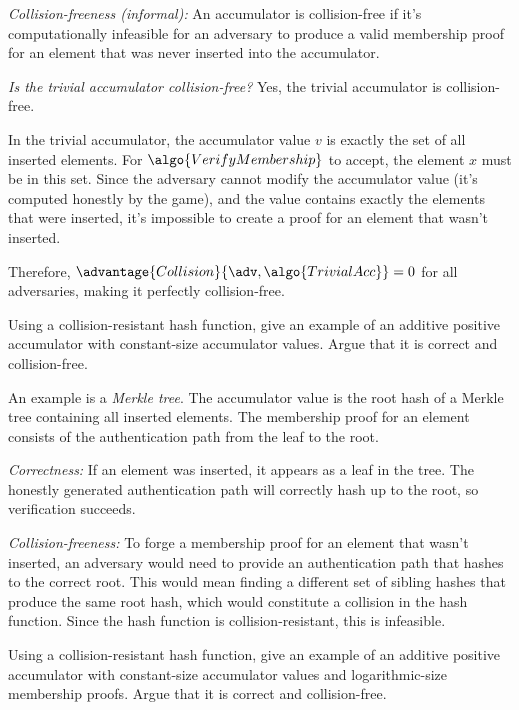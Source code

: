 \ifsolutions
\begin{mysolution}
  \emph{Collision-freeness (informal):} An accumulator is collision-free if it's computationally infeasible for an adversary to produce a valid membership proof for an element that was never inserted into the accumulator.
  
  \emph{Is the trivial accumulator collision-free?} Yes, the trivial accumulator is collision-free.
  
  In the trivial accumulator, the accumulator value $v$ is exactly the set of all inserted elements.
  For $\algo{VerifyMembership}$ to accept, the element $x$ must be in this set.
  Since the adversary cannot modify the accumulator value (it's computed honestly by the game), and the value contains exactly the elements that were inserted, it's impossible to create a proof for an element that wasn't inserted.
  
  Therefore, $\advantage{Collision}{\adv, \algo{TrivialAcc}} = 0$ for all adversaries, making it perfectly collision-free.
\end{mysolution}
\fi

\begin{exercise}
  Using a collision-resistant hash function, give an example of an additive positive accumulator with constant-size accumulator values.
  Argue that it is correct and collision-free.
\end{exercise}

\ifsolutions
\begin{mysolution}
  An example is a \emph{Merkle tree}.
  The accumulator value is the root hash of a Merkle tree containing all inserted elements.
  The membership proof for an element consists of the authentication path from the leaf to the root.
  
  \emph{Correctness:} If an element was inserted, it appears as a leaf in the tree.
  The honestly generated authentication path will correctly hash up to the root, so verification succeeds.
  
  \emph{Collision-freeness:} To forge a membership proof for an element that wasn't inserted, an adversary would need to provide an authentication path that hashes to the correct root.
  This would mean finding a different set of sibling hashes that produce the same root hash, which would constitute a collision in the hash function.
  Since the hash function is collision-resistant, this is infeasible.
\end{mysolution}
\fi

\begin{exercise}[Optional]
  Using a collision-resistant hash function, give an example of an additive positive accumulator with constant-size accumulator values and logarithmic-size membership proofs.
  Argue that it is correct and collision-free.
\end{exercise}

